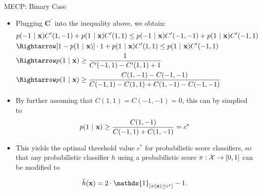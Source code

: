 \documentclass[11pt,compress,t,notes=noshow, xcolor=table]{beamer}
\begin{document}
\begin{vbframe}{MECP: Binary Case}
{\begin{itemize}
			\item Plugging $\mathbf{C}^\prime$ into the inequality above, we obtain:	
			\begin{align*}	
                & p(-1 ~|~ \xv ) C^\prime(1,-1)  + 	p(1 ~|~ \xv ) C^\prime(1,1) \leq  p(-1 ~|~ \xv ) C^\prime(-1,-1)  + 	p(1 ~|~ \xv ) C^\prime(-1,1)  \\ 
                &\Rightarrow [1 - p(1 ~|~ \xv)] \cdot 1 + p(1 ~|~ \xv) C^\prime(1, 1) \leq p(1 ~|~ \xv) C^\prime(-1, 1) \\
                &\Rightarrow p(1 ~|~ \xv) \geq \frac{1}{C^\prime(-1, 1) - C^\prime(1, 1) + 1} \\
                &\Rightarrow p(1 ~|~ \xv) \geq \frac{C(1, -1) - C(-1, -1)}{C(-1, 1) - C(1, 1) + C(1, -1) - C(-1, -1)}
			\end{align*}
		
            \item By further assuming that $C(1, 1) = C(-1, -1) = 0 $, this can by simplied to 
            \begin{align*}
                p(1 ~|~ \mathbf{x}) \geq \frac{C(1, -1)}{C(-1, 1) + C(1, -1)} = c^{*}
            \end{align*}	
            
            \item This yields the optimal threshold value $c^*$ for probabilistic score classifiers, so that any probabilistic classifier $h$ using a probabilistic score $\pi:\mathcal{X} \to [0,1]$ can be modified to 
            
            $$   \tilde h(\xv) = 2 \cdot \mathds{1}_{[ \pi(\xv) \geq c^*]} -1. $$
							
		\end{itemize}
	}
\end{vbframe}
\end{document}
